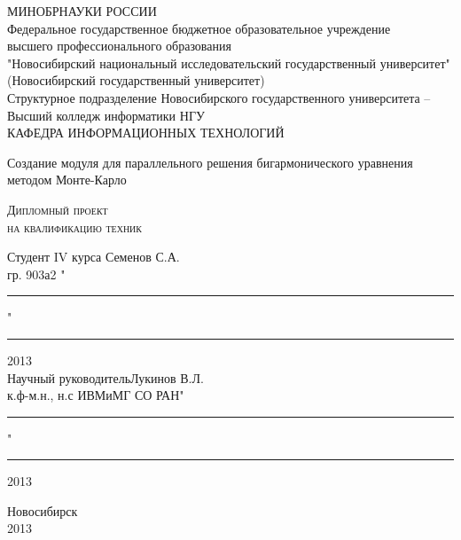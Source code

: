 \begin{titlepage}

\begin{center}
МИНОБРНАУКИ РОССИИ\\
Федеральное государственное бюджетное образовательное учреждение\\
высшего профессионального образования \\
\hspace{-10mm}"Новосибирский национальный исследовательский государственный университет"\\
(Новосибирский государственный университет)\\
\hspace{-7mm}Структурное подразделение Новосибирского государственного университета -- \\
Высший колледж информатики НГУ\\
КАФЕДРА ИНФОРМАЦИОННЫХ ТЕХНОЛОГИЙ
\end{center}


\vspace{8em}

\begin{center}
\Large Создание модуля для параллельного решения бигармонического уравнения методом Монте-Карло 
\end{center}

\vspace{2.5em}

\begin{center}
\textsc{Дипломный проект\\ на квалификацию техник }
\end{center}

\vspace{6em}

\begin{flushleft}
 Студент IV курса \hfill Семенов С.А. \\
гр. 903а2 \hfill "\rule{3ex}{0,1mm}"\rule{10ex}{0,1mm}2013 \\
\vspace{1.5em}
Научный руководитель\hfill Лукинов В.Л.\\
к.ф-м.н., н.с ИВМиМГ СО РАН\hfill "\rule{3ex}{0,1mm}"\rule{10ex}{0,1mm}2013 \\
\end{flushleft}

\vspace{\fill}
\begin{center}
Новосибирск\\ 2013
\end{center}
\end{titlepage}
